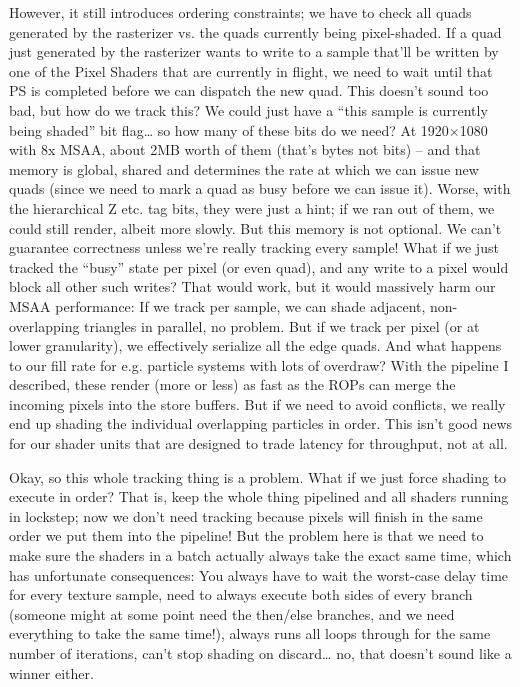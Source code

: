 \documentclass[12pt]{article}
\begin{document}
However, it still introduces ordering constraints; we have to check all quads generated by the rasterizer vs. the quads currently being pixel-shaded. If a quad just generated by the rasterizer wants to write to a sample that’ll be written by one of the Pixel Shaders that are currently in flight, we need to wait until that PS is completed before we can dispatch the new quad. This doesn’t sound too bad, but how do we track this? We could just have a “this sample is currently being shaded” bit flag… so how many of these bits do we need? At 1920×1080 with 8x MSAA, about 2MB worth of them (that’s bytes not bits) – and that memory is global, shared and determines the rate at which we can issue new quads (since we need to mark a quad as busy before we can issue it). Worse, with the hierarchical Z etc. tag bits, they were just a hint; if we ran out of them, we could still render, albeit more slowly. But this memory is not optional. We can’t guarantee correctness unless we’re really tracking every sample! What if we just tracked the “busy” state per pixel (or even quad), and any write to a pixel would block all other such writes? That would work, but it would massively harm our MSAA performance: If we track per sample, we can shade adjacent, non-overlapping triangles in parallel, no problem. But if we track per pixel (or at lower granularity), we effectively serialize all the edge quads. And what happens to our fill rate for e.g. particle systems with lots of overdraw? With the pipeline I described, these render (more or less) as fast as the ROPs can merge the incoming pixels into the store buffers. But if we need to avoid conflicts, we really end up shading the individual overlapping particles in order. This isn’t good news for our shader units that are designed to trade latency for throughput, not at all.

Okay, so this whole tracking thing is a problem. What if we just force shading to execute in order? That is, keep the whole thing pipelined and all shaders running in lockstep; now we don’t need tracking because pixels will finish in the same order we put them into the pipeline! But the problem here is that we need to make sure the shaders in a batch actually always take the exact same time, which has unfortunate consequences: You always have to wait the worst-case delay time for every texture sample, need to always execute both sides of every branch (someone might at some point need the then/else branches, and we need everything to take the same time!), always runs all loops through for the same number of iterations, can’t stop shading on discard… no, that doesn’t sound like a winner either.
\end{document}
